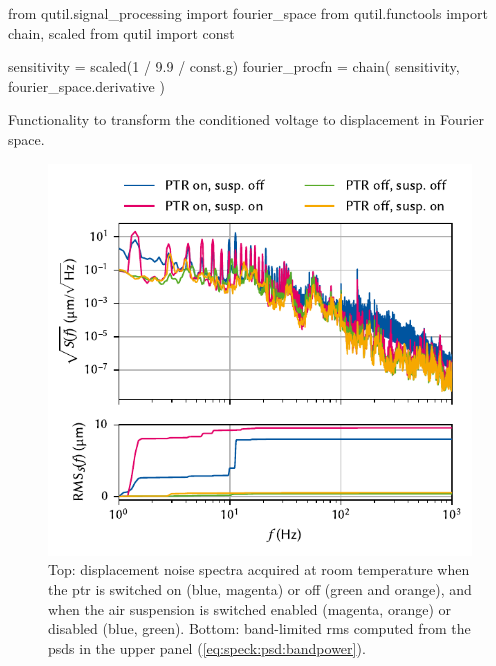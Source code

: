 \begin{marginlisting}
    \begin{py}[
        fontsize=\footnotesize,
        breaklines,%
        breakafter=.,%
    ]
        from qutil.signal_processing import fourier_space
        from qutil.functools import chain, scaled
        from qutil import const

        sensitivity = scaled(1 / 9.9 / const.g)
        fourier_procfn = chain(
            sensitivity,
            fourier_space.derivative
        )
    \end{py}
    \caption{Functionality to transform the conditioned voltage to displacement in Fourier space.}
    \label{lst:setup:vibrations:accelerometer}
\end{marginlisting}
\begin{figure}
    \centering
    \includegraphics{img/pdf/setup/spect_accel}
    \caption[]{
        Top: displacement noise spectra acquired at room temperature when the \gls{ptr} is switched on (blue, magenta) or off (green and orange), and when the air suspension is switched enabled (magenta, orange) or disabled (blue, green).
        Bottom: band-limited \gls{rms} computed from the \glspl{psd} in the upper panel (\cf \cref{eq:speck:psd:bandpower}).
    }
    \label{fig:setup:vibrations:accelerometer}
\end{figure}

